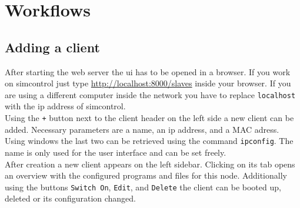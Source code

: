 \documentclass[accentcolor=tud1a, paper=a4, colorback]{tudreport}
\newcommand{\ind}[1]{#1\index{#1}}
\begin{document}
	\chapter{Workflows}
	\section{Adding a client}
	After starting the web server the ui has to be opened in a browser.
	If you work on \ind{simcontrol} just type \url{http://localhost:8000/slaves} inside
	your browser. If you are using a different computer inside the network you
	have to replace \texttt{localhost} with the ip address of simcontrol.
	\\
	Using the \texttt{+} button next to the client header on the left side
	a new client can be added. Necessary parameters are a name, an ip address,
	and a MAC adress. Using windows the last two can be retrieved using
	the command \texttt{ipconfig}. The name is only used for the user interface
	and can be set freely.
	\\
	After creation a new client appears on the left sidebar. Clicking on its tab
	opens an overview with the configured programs and files for this node.
	Additionally using the buttons \texttt{Switch On}, \texttt{Edit}, and \texttt{Delete}
	the client can be booted up, deleted or its configuration changed.
\end{document}
